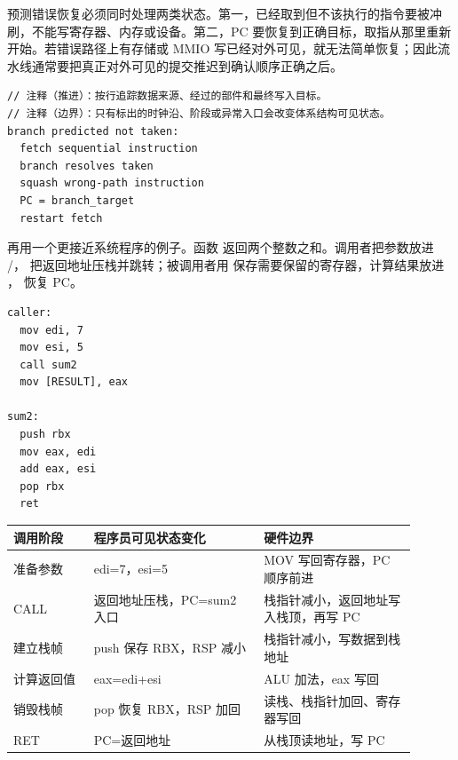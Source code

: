 预测错误恢复必须同时处理两类状态。第一，已经取到但不该执行的指令要被冲刷，不能写寄存器、内存或设备。第二，PC 要恢复到正确目标，取指从那里重新开始。若错误路径上有存储或 MMIO 写已经对外可见，就无法简单恢复；因此流水线通常要把真正对外可见的提交推迟到确认顺序正确之后。

\begin{lstlisting}
// 注释（推进）：按行追踪数据来源、经过的部件和最终写入目标。
// 注释（边界）：只有标出的时钟沿、阶段或异常入口会改变体系结构可见状态。
branch predicted not taken:
  fetch sequential instruction
  branch resolves taken
  squash wrong-path instruction
  PC = branch_target
  restart fetch
\end{lstlisting}

再用一个更接近系统程序的例子。函数  返回两个整数之和。调用者把参数放进 /， 把返回地址压栈并跳转；被调用者用  保存需要保留的寄存器，计算结果放进 ， 恢复 PC。

\begin{lstlisting}
caller:
  mov edi, 7
  mov esi, 5
  call sum2
  mov [RESULT], eax

sum2:
  push rbx
  mov eax, edi
  add eax, esi
  pop rbx
  ret
\end{lstlisting}

\begin{longtable}{L{0.18\linewidth}L{0.38\linewidth}L{0.34\linewidth}}
\toprule
调用阶段 & 程序员可见状态变化 & 硬件边界 \\
\midrule
准备参数 & edi=7，esi=5 & MOV 写回寄存器，PC 顺序前进 \\\tablerowrule
CALL & 返回地址压栈，PC=sum2 入口 & 栈指针减小，返回地址写入栈顶，再写 PC \\\tablerowrule
建立栈帧 & push 保存 RBX，RSP 减小 & 栈指针减小，写数据到栈地址 \\\tablerowrule
计算返回值 & eax=edi+esi & ALU 加法，eax 写回 \\\tablerowrule
销毁栈帧 & pop 恢复 RBX，RSP 加回 & 读栈、栈指针加回、寄存器写回 \\\tablerowrule
RET & PC=返回地址 & 从栈顶读地址，写 PC \\
\bottomrule
\end{longtable}

